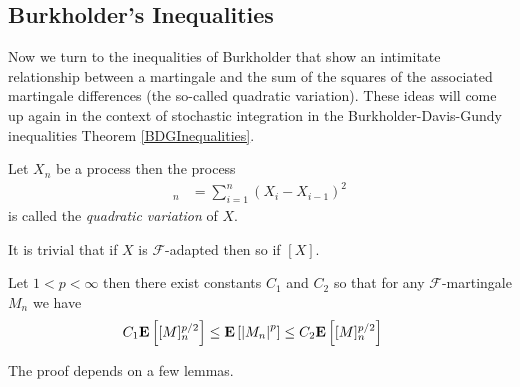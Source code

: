 \subsection{Burkholder's Inequalities}

Now we turn to the inequalities of Burkholder that show an intimitate
relationship between a martingale and the sum of the squares of the associated 
martingale differences (the so-called quadratic variation).  These ideas will come up again in the context of stochastic integration
in the Burkholder-Davis-Gundy inequalities Theorem \ref{BDGInequalities}.

\begin{defn}Let $X_n$ be a  process  then the process
\begin{align*}
[X]_n &= \sum_{i=1}^n (X_i - X_{i-1})^2
\end{align*}
is called the \emph{quadratic variation} of $X$.
\end{defn}

It is trivial that if $X$ is $\mathcal{F}$-adapted then so if $[X]$.

\begin{thm}\label{BurkholderInequalities}Let $1 < p < \infty$ then
there exist constants $C_1$ and $C_2$ so that for any $\mathcal{F}$-martingale 
$M_n$ we have
\begin{align*}
C_1 \textbf{E}\left[[M]_n^{p/2}\right] &\leq \textbf{E}\left[\left \vert M_n \right \vert^{p}\right] \leq C_2 \textbf{E}\left[[M]_n^{p/2}\right]
\end{align*}
\end{thm}

The proof depends on a few lemmas.

